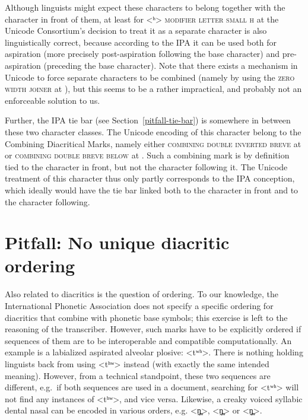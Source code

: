 Although linguists might expect these characters to belong together with the
character in front of them, at least for <ʰ> \textsc{modifier letter small h} at
 the Unicode Consortium's decision to treat it as a separate character
is also linguistically correct, because according to the IPA it can be used both
for aspiration (more precisely post-aspiration following the base character) and
pre-aspiration (preceding the base character). Note that there exists a mechanism in
Unicode to force separate characters to be combined (namely by using the
\textsc{zero width joiner} at ), but this seems to be a rather
impractical, and probably not an enforceable solution to us.

Further, the IPA tie bar (see Section~\ref{pitfall-tie-bar}) is somewhere in
between these two character classes. The Unicode encoding of this character
belong to the Combining Diacritical Marks, namely either \textsc{combining double
inverted breve} at  or \textsc{combining double breve below} at
. Such a combining mark is by definition tied to the character in
front, but not the character following it. The Unicode treatment of this
character thus only partly corresponds to the IPA conception, which ideally
would have the tie bar linked both to the character in front and to the
character following.

\section{Pitfall: No unique diacritic ordering}
\label{pitfall-no-unique-diacritic-ordering}

Also related to diacritics is the question of ordering. To our knowledge, the
International Phonetic Association does not specify a specific ordering for
diacritics that combine with phonetic base symbols; this exercise is left to the
reasoning of the transcriber. However, such marks have to be explicitly ordered
if sequences of them are to be interoperable and compatible computationally. An example is a
labialized aspirated alveolar plosive: <tʷʰ>. There is nothing holding linguists
back from using <tʰʷ> instead (with exactly the same intended meaning). However,
from a technical standpoint, these two sequences are different, e.g.~if both
sequences are used in a document, searching for <tʷʰ> will not find any
instances of <tʰʷ>, and vice versa. Likewise, a creaky voiced syllabic dental
nasal can be encoded in various orders, e.g. <n̪̰̩>, <n̩̰̪> or <n̩̪̰>.

